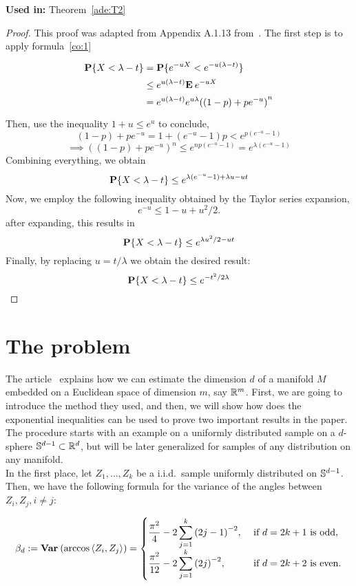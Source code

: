 \textbf{Used in:} Theorem~\ref{ade:T2}

\begin{proof}
This proof was adapted from Appendix A.1.13 from~\cite{alon2016probabilistic}. The first step is to apply formula~\ref{co:1}
  \[ 
    \everymath{\displaystyle}\arraycolsep=1.4pt\def\arraystretch{1.5}
    \begin{array}{rcl}
      \P \{X < \lambda - t\} & = & \P \{e^{-uX} < e^{-u(\lambda - t)}\}\\
      & \leq & e^{u(\lambda-t)} \E e^{-uX}\\
      & = & e^{u(\lambda-t)} e^{u\lambda} {((1-p) + p e^{-u})}^n
    \end{array} 
   \]
   Then, use the inequality $1+u\leq e^{u}$ to conclude,
   \[ (1-p)+pe^{-u} = 1+(e^{-u}-1)p < e^{p(e^{-u}-1)} \]
   \[ \implies {((1-p)+pe^{-u})}^n \leq e^{np(e^{-u}-1)} = e^{\lambda(e^{-u}-1)} \] 
   Combining everything, we obtain
   \[ \P \{X < \lambda - t\} \leq e^{\lambda(e^{-u}-1)+\lambda u - ut} \]
   Now, we employ the following inequality obtained by the Taylor series expansion,
   \[ e^{-u} \leq 1-u+u^2/2.\]
   after expanding, this results in 
   \[ \P \{X < \lambda - t\} \leq e^{\lambda u^2 / 2 - ut} \]
   Finally, by replacing $u = t/\lambda$ we obtain the desired result:
   \[ \P \{X < \lambda - t\} \leq e^{-t^2/2\lambda} \] 
\end{proof}

\section{The problem}

The article~\cite{diaz2019local} explains how we can estimate the dimension $d$ of a manifold $M$ embedded on a Euclidean space of dimension $m$, say $\R^m$. First, we are going to introduce the method they used, and then, we will show how does the exponential inequalities can be used to prove two important results in the paper. The procedure starts with an example on a uniformly distributed sample on a $d$-sphere $\S^{d-1} \subset \R^d$, but will be later generalized for samples of any distribution on any manifold.\\[1em]

In the first place, let $Z_1, \ldots, Z_k$ be a i.i.d.\ sample uniformly distributed on $\S^{d-1}$. Then, we have the following formula for the variance of the angles between $Z_i,Z_j, i\neq j$:

\begin{equation}\label{ade:1}\everymath{\displaystyle}
  \beta_d := \Var(\arccos \angles{Z_i,Z_j}) = \begin{cases}
    \frac{\pi^2}{4} - 2 \sum_{j = 1}^{k} {(2j-1)}^{-2}, & \mbox{ if } d = 2k+1 \mbox{ is odd},\\
    \frac{\pi^2}{12}- 2 \sum_{j = 1}^{k} {(2j)}^{-2}, & \mbox{ if } d = 2k+2 \mbox{ is even.}
  \end{cases}
\end{equation}


